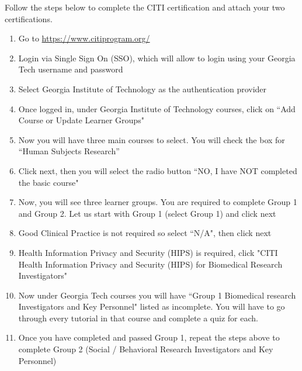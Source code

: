 \documentclass[12pt]{article}
\begin{document}

Follow the steps below to complete the CITI certification and attach your two certifications.
\begin{enumerate}[nolistsep]
\item Go to \url{https://www.citiprogram.org/}
\item Login via Single Sign On (SSO), which will allow to login using your Georgia Tech username and password
\item Select Georgia Institute of Technology as the authentication provider
\item Once logged in, under Georgia Institute of Technology courses, click on ``Add Course or Update Learner Groups"
\item Now you will have three main courses to select. You will check the box for ``Human Subjects Research''
\item Click next, then you will select the radio button ``NO, I have NOT completed the basic course"
\item Now, you will see three learner groups. You are required to complete Group 1 and Group 2. Let us start with Group 1 (select Group 1) and click next
\item Good Clinical Practice is not required so select ``N/A", then click next
\item Health Information Privacy and Security (HIPS) is required, click "CITI Health Information Privacy and Security (HIPS) for Biomedical Research Investigators"
\item Now under Georgia Tech courses you will have ``Group 1 Biomedical research Investigators and Key Personnel" listed as incomplete. You will have to go through every tutorial in that course and complete a quiz for each.
\item Once you have completed and passed Group 1, repeat the steps above to complete Group 2 (Social / Behavioral Research Investigators and Key Personnel)
\end{enumerate}
\end{document}

